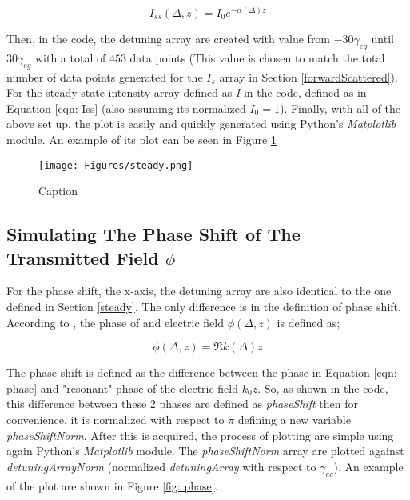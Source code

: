 \begin{equation}
    I_{ss}(\Delta, z) = I_{0} e^{-\alpha(\Delta) z}
    \label{eqn: Iss}
\end{equation}

Then, in the code, the detuning array are created with value from $-30\gamma_{eg}$ until $30\gamma_{eg}$ with a total of $453$ data points (This value is chosen to match the total number of data points generated for the $I_{s}$ array in Section \ref{forwardScattered}). For the steady-state intensity array defined as \textit{I} in the code, defined as in Equation \ref{eqn: Iss} (also assuming its normalized $I_{0} = 1$). Finally, with all of the above set up, the plot is easily and quickly generated using Python's \textit{Matplotlib} module. An example of its plot can be seen in Figure \ref{fig: steady}

\begin{figure}[h!]
    \centering
    \texttt{[image: Figures/steady.png]}
    \caption{Caption}
    \label{fig: steady}
\end{figure}

\subsection{Simulating The Phase Shift of The Transmitted Field $\phi$}
For the phase shift, the x-axis, the detuning array are also identical to the one defined in Section \ref{steady}. The only difference is in the definition of phase shift. According to \cite{boyd2020nonlinear}, the phase of and electric field $\phi(\Delta, z)$ is defined as;

\begin{equation}
    \phi(\Delta, z) = \Re{k(\Delta)} z
    \label{eqn: phase}
\end{equation}

The phase shift is defined as the difference between the phase in Equation \ref{eqn: phase} and "resonant" phase of the electric field $k_{0}z$. So, as shown in the code, this difference between these 2 phases are defined as \textit{phaseShift} then for convenience, it is normalized with respect to $\pi$ defining a new variable \textit{phaseShiftNorm}. After this is acquired, the process of plotting are simple using again Python's \textit{Matplotlib} module. The \textit{phaseShiftNorm} array are plotted against \textit{detuningArrayNorm} (normalized \textit{detuningArray} with respect to $\gamma_{eg}$). An example of the plot are shown in Figure \ref{fig: phase}.

